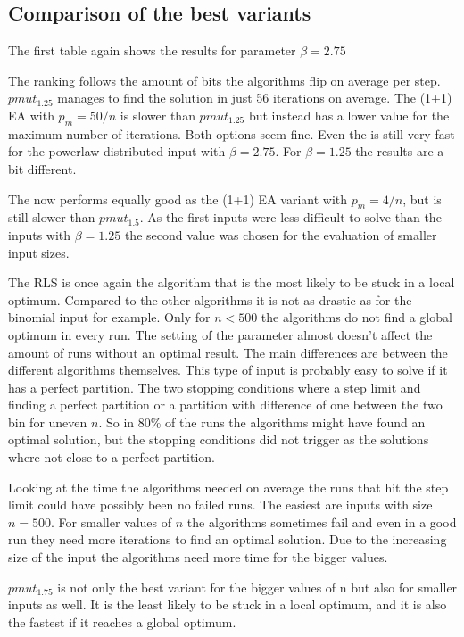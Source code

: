 \subsection{Comparison of the best variants}
The first table again shows the results for parameter $\beta=2.75$



The ranking follows the amount of bits the algorithms flip on average per step.
$pmut_{1.25}$ manages to find the solution in just 56 iterations on average.
The (1+1) EA with $p_m=50/n$ is slower than $pmut_{1.25}$ but instead has a lower value for the maximum number of iterations.
Both options seem fine.
Even the \RLSN[4] is still very fast for the powerlaw distributed input with $\beta = 2.75$.
For $\beta = 1.25$ the results are a bit different.

The \RLSR[4] now performs equally good as the (1+1) EA variant with $p_m=4/n$, but is still slower than $pmut_{1.5}$.
As the first inputs were less difficult to solve than the inputs with $\beta = 1.25$ the second value was chosen for the evaluation of smaller input sizes.



The RLS is once again the algorithm that is the most likely to be stuck in a local optimum.
Compared to the other algorithms it is not as drastic as for the binomial input for example.
Only for $n<500$ the algorithms do not find a global optimum in every run.
The setting of the parameter almost doesn't affect the amount of runs without an optimal result.
The main differences are between the different algorithms themselves.
This type of input is probably easy to solve if it has a perfect partition.
The two stopping conditions where a step limit and finding a perfect partition or a partition with difference of one between the two bin for uneven $n$.
So in 80\% of the runs the algorithms might have found an optimal solution, but the stopping conditions did not trigger as the solutions where not close to a perfect partition.



Looking at the time the algorithms needed on average the runs that hit the step limit could have possibly been no failed runs.
The easiest are inputs with size $n=500$.
For smaller values of $n$ the algorithms sometimes fail and even in a good run they need more iterations to find an optimal solution.
Due to the increasing size of the input the algorithms need more time for the bigger values.



$pmut_{1.75}$ is not only the best variant for the bigger values of n but also for smaller inputs as well.
It is the least likely to be stuck in a local optimum, and it is also the fastest if it reaches a global optimum.
